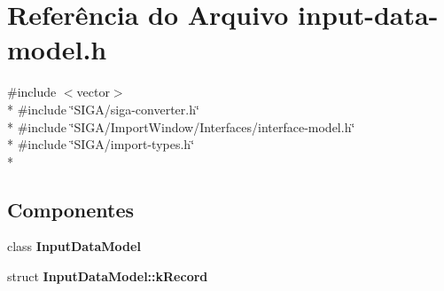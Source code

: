 \section{Referência do Arquivo input-\/data-\/model.h}
\label{input-data-model_8h}
{\ttfamily \#include $<$vector$>$}\\*
{\ttfamily \#include \char`\"{}S\+I\+G\+A/siga-\/converter.\+h\char`\"{}}\\*
{\ttfamily \#include \char`\"{}S\+I\+G\+A/\+Import\+Window/\+Interfaces/interface-\/model.\+h\char`\"{}}\\*
{\ttfamily \#include \char`\"{}S\+I\+G\+A/import-\/types.\+h\char`\"{}}\\*
\subsection*{Componentes}
\begin{DoxyCompactItemize}
\item 
class {\bf Input\+Data\+Model}
\item 
struct {\bf Input\+Data\+Model\+::k\+Record}
\end{DoxyCompactItemize}
